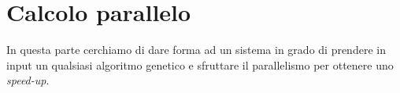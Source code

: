 \section{Calcolo parallelo}

In questa parte cerchiamo di dare forma ad un sistema in grado di prendere
in input un qualsiasi algoritmo genetico e sfruttare il parallelismo per
ottenere uno \emph{speed-up}.

